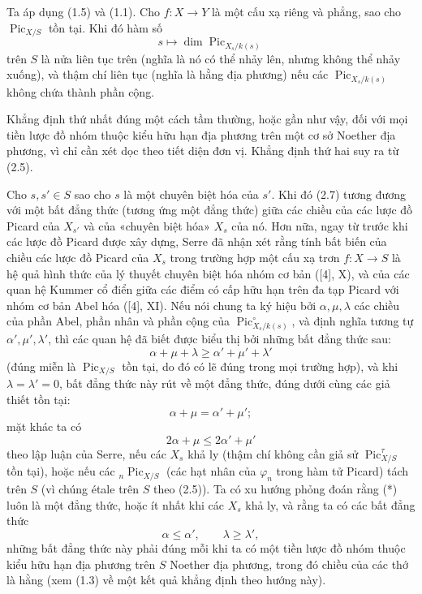 Ta áp dụng (1.5) và (1.1).
 Cho $f:X\longrightarrow Y$ là một cấu xạ riêng và phẳng, sao cho $\operatorname{Pic}_{X/S}$ tồn
tại. Khi đó hàm số
\[
s\longmapsto\dim\operatorname{Pic}_{X_s/k(s)}
\]
trên $S$ là nửa liên tục trên (nghĩa là nó có thể nhảy lên, nhưng không thể
nhảy xuống), và thậm chí liên tục (nghĩa là hằng địa phương) nếu các
$\operatorname{Pic}_{X_s/k(s)}$ không chứa thành phần cộng.

Khẳng định thứ nhất đúng một cách tầm thường, hoặc gần như vậy, đối với mọi
tiền lược đồ nhóm thuộc kiểu hữu hạn địa phương trên một cơ sở Noether địa
phương, vì chỉ cần xét dọc theo tiết diện đơn vị. Khẳng định thứ hai suy ra từ
(2.5).

 Cho $s,s'\in S$ sao cho $s$ là một chuyên biệt hóa của
$s'$. Khi đó (2.7) tương đương với một bất đẳng thức (tương ứng một đẳng thức)
giữa các chiều của các lược đồ Picard của $X_{s'}$ và của «chuyên biệt hóa»
$X_s$ của nó. Hơn nữa, ngay từ trước khi các lược đồ Picard được xây dựng,
Serre đã nhận xét rằng tính bất biến của chiều các lược đồ Picard của $X_s$ trong
trường hợp một cấu xạ trơn $f:X\longrightarrow S$ là hệ quả hình thức của lý
thuyết chuyên biệt hóa nhóm cơ bản ([4], X), và của các quan hệ Kummer cổ điển
giữa các điểm có cấp hữu hạn trên đa tạp Picard với nhóm cơ bản Abel hóa ([4],
XI). Nếu nói chung ta ký hiệu bởi $\alpha,\mu,\lambda$ các chiều của phần Abel,
phần nhân và phần cộng của $\operatorname{Pic}_{X_s/k(s)}^\circ$, và định
nghĩa tương tự $\alpha',\mu',\lambda'$, thì các quan hệ đã biết được biểu thị
bởi những bất đẳng thức sau:
\[
\tag{*}\alpha+\mu+\lambda\geq\alpha'+\mu'+\lambda'
\]
(đúng miễn là $\operatorname{Pic}_{X/S}$ tồn tại, do đó có lẽ đúng trong mọi
trường hợp), và khi $\lambda=\lambda'=0$, bất đẳng thức này rút về một đẳng
thức, đúng dưới cùng các giả thiết tồn tại:
\[
\alpha+\mu=\alpha'+\mu' ;
\]
mặt khác ta có
\[
\tag{**}2\alpha+\mu\leq2\alpha'+\mu'
\]
theo lập luận của Serre, nếu các $X_s$ khả ly (thậm chí không cần giả sử
$\operatorname{Pic}_{X/S}^\tau$ tồn tại), hoặc nếu các
${}_n\operatorname{Pic}_{X/S}$ (các hạt nhân của $\varphi_n$ trong hàm tử
Picard) tách trên $S$ (vì chúng étale trên $S$ theo (2.5)). Ta có xu hướng
phỏng đoán rằng (*) luôn là một đẳng thức, hoặc ít nhất khi các $X_s$ khả ly,
và rằng ta có các bất đẳng thức
\[
\tag{***}\alpha\leq\alpha',\qquad\lambda\geq\lambda',
\]
những bất đẳng thức này phải đúng mỗi khi ta có một tiền lược đồ nhóm thuộc
kiểu hữu hạn địa phương trên $S$ Noether địa phương, trong đó chiều của các
thớ là hằng (xem (1.3) về một kết quả khẳng định theo hướng này).

